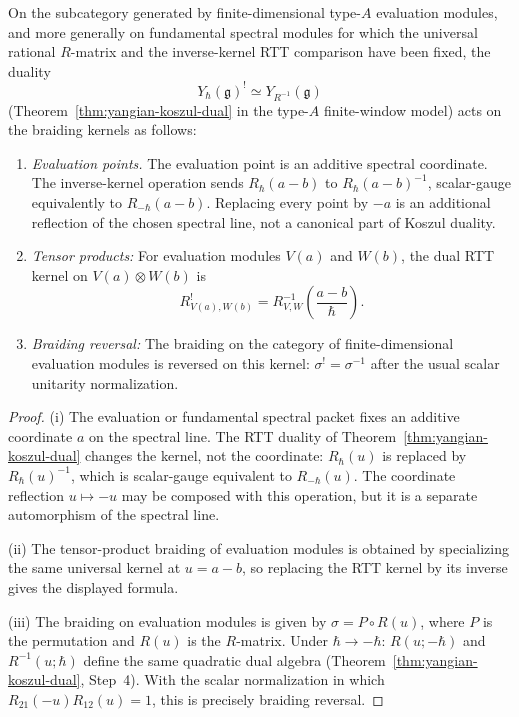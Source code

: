 \begin{proposition}
\label{prop:yangian-module-koszul}
On the subcategory generated by finite-dimensional type-$A$
evaluation modules, and more generally on fundamental spectral
modules for which the universal rational $R$-matrix and the
inverse-kernel RTT comparison have been fixed, the duality
\[
Y_\hbar(\mathfrak{g})^! \simeq Y_{R^{-1}}(\mathfrak{g})
\]
\textup{(}Theorem~\textup{\ref{thm:yangian-koszul-dual}} in the
type-$A$ finite-window model\textup{)} acts on the braiding kernels as
follows:
\begin{enumerate}[label=\textup{(\roman*)}]
\item \emph{Evaluation points.}  The evaluation point is an additive
 spectral coordinate.  The inverse-kernel operation sends
 $R_\hbar(a-b)$ to $R_\hbar(a-b)^{-1}$, scalar-gauge equivalently to
 $R_{-\hbar}(a-b)$.  Replacing every point by $-a$ is an additional
 reflection of the chosen spectral line, not a canonical part of
 Koszul duality.
\item \emph{Tensor products:} For evaluation modules $V(a)$ and
 $W(b)$, the dual RTT kernel on $V(a)\otimes W(b)$ is
 \[
 R^!_{V(a), W(b)}
 = R_{V,W}^{-1}\!\left(\frac{a - b}{\hbar}\right).
 \]
\item \emph{Braiding reversal:} The braiding on the category of
 finite-dimensional evaluation modules is reversed on this kernel:
 $\sigma^! = \sigma^{-1}$ after the usual scalar unitarity
 normalization.
\end{enumerate}
\end{proposition}

\begin{proof}
(i) The evaluation or fundamental spectral packet fixes an additive
coordinate $a$ on the spectral line.  The RTT duality of
Theorem~\ref{thm:yangian-koszul-dual} changes the kernel, not the
coordinate: $R_\hbar(u)$ is replaced by $R_\hbar(u)^{-1}$, which is
scalar-gauge equivalent to $R_{-\hbar}(u)$.  The coordinate reflection
$u\mapsto -u$ may be composed with this operation, but it is a
separate automorphism of the spectral line.

(ii) The tensor-product braiding of evaluation modules is obtained by
specializing the same universal kernel at $u=a-b$, so replacing the
RTT kernel by its inverse gives the displayed formula.

(iii) The braiding on evaluation modules is given by
$\sigma = P \circ R(u)$, where $P$ is the permutation and
$R(u)$ is the $R$-matrix. Under $\hbar \to -\hbar$:
$R(u; -\hbar)$ and $R^{-1}(u; \hbar)$ define the same quadratic
dual algebra (Theorem~\ref{thm:yangian-koszul-dual}, Step~4).  With
the scalar normalization in which $R_{21}(-u)R_{12}(u)=1$, this is
precisely braiding reversal.
\end{proof}

